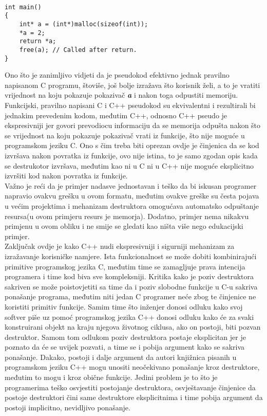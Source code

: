 \begin{lstlisting}

int main()
{
    int* a = (int*)malloc(sizeof(int));
    *a = 2;
    return *a;
    free(a); // Called after return.
}
\end{lstlisting}
Ono što je zanimljivo vidjeti da je pseudokod efektivno jednak pravilno napisanom C programu, štoviše, još bolje izražava što korisnik želi, a to je vratiti vrijednost na koju pokazuje pokazivač \textbf{\textit{a}} i nakon toga odpustiti memoriju. Funkcijski, pravilno napisani C i C++ pseudokod su ekvivalentni i rezultirali bi jednakim prevedenim kodom, međutim C++, odnosno C++ pseudo je ekspresivniji jer govori prevodiocu informaciju da se memorija odpušta nakon što se vrijednost na koju pokazuje pokazivač vrati iz funkcije, što nije moguće u programskom jeziku C. Ono s čim treba biti oprezan ovdje je činjenica da se kod izvršava nakon povratka iz funkcije, ovo nije istina, to je samo zgodan opis kada se destrukotor izvršava, međutim kao ni u C ni u C++ nije moguće eksplicitno izvršiti kod nakon povratka iz funkcije. \\
Važno je reći da je primjer nadasve jednostavan i teško da bi iskusan programer napravio ovakvu grešku u ovom formatu, međutim ovakve greške su česta pojava u većim projektima i mehanizam destruktora omogućava automatsko odpuštanje resursa(u ovom primjeru resurs je memorja). Dodatno, primjer nema nikakvu primjenu u ovom obliku i ne smije se gledati kao ništa više nego edukacijski primjer. \\
Zaključak ovdje je kako C++ nudi ekspresivniji i sigurniji mehanizam za izražavanje korisničke namjere. Ista funkcionalnost se može dobiti kombinirajući primitive programskog jezika C, međutim time se zamagljuje prava intencija programera i time kod biva sve kompleksniji. Kritika kako je poziv destruktora sakriven se može poistovjetiti sa time da i poziv slobodne funkcije u C-u sakriva ponašanje programa, međutim niti jedan C programer neće zbog te činjenice ne koristiti primitiv funkcije. Samim time što inženjer donosi odluku kako svoj softver piše uz pomoć programskog jezika C++ donosi odluku kako će za svaki konstruirani objekt na kraju njegova životnog ciklusa, ako on postoji, biti pozvan destruktor. Samom tom odlukom poziv destruktora postaje eksplicitan jer je poznato da će se uvijek pozvati, a time se i pobija argument kako se sakriva ponašanje. Dakako, postoji i dalje argument da autori knjižnica pisanih u programskom jeziku C++ mogu unositi neočekivano ponašanje kroz destruktore, međutim to mogu i kroz obične funkcije. Jedini problem je to što je programerima teško osvjestiti postojanje destruktora, osvještavanje činjenice da postoje destruktori čini same destruktore eksplicitnima i time pobija argument da postoji implicitno, nevidljivo ponašanje. 


